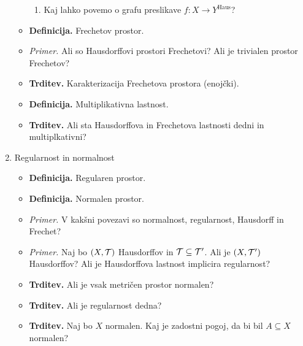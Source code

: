 \begin{enumerate}
\begin{itemize}
\begin{enumerate}
            \item Kaj lahko povemo o grafu preslikave $f: X \to Y^\text{Haus}$?
        \end{enumerate}
        \item \colorbox{purple!30}{\textbf{Definicija.}} Frechetov prostor.
        \item \colorbox{yellow!30}{\emph{Primer.}} Ali so Hausdorffovi prostori Frechetovi? Ali je trivialen prostor Frechetov?
        \item \colorbox{blue!30}{\textbf{Trditev.}} Karakterizacija Frechetova prostora (enojčki).
        \item \colorbox{purple!30}{\textbf{Definicija.}} Multiplikativna lastnost.
        \item \colorbox{blue!30}{\textbf{Trditev.}} Ali sta Hausdorffova in Frechetova lastnosti dedni in multiplkativni?        
    \end{itemize}

    \item Regularnost in normalnost
    \begin{itemize}
        \item \colorbox{purple!30}{\textbf{Definicija.}} Regularen prostor.
        \item \colorbox{purple!30}{\textbf{Definicija.}} Normalen prostor.
        \item \colorbox{yellow!30}{\emph{Primer.}} V kakšni povezavi so normalnost, regularnost, Hausdorff in Frechet?
        \item \colorbox{yellow!30}{\emph{Primer.}} Naj bo $(X, \mathcal{T})$ Hausdorffov in $\mathcal{T} \subseteq \mathcal{T}'$. Ali je $(X, \mathcal{T}')$ Hausdorffov? Ali je Hausdorffova lastnost implicira regularnost?
        \item \colorbox{blue!30}{\textbf{Trditev.}} Ali je vsak metričen prostor normalen?
        \item \colorbox{blue!30}{\textbf{Trditev.}} Ali je regularnost dedna?
        \item \colorbox{blue!30}{\textbf{Trditev.}} Naj bo $X$ normalen. Kaj je zadostni pogoj, da bi bil $A \subseteq X$ normalen?
    \end{itemize}


\end{enumerate}
